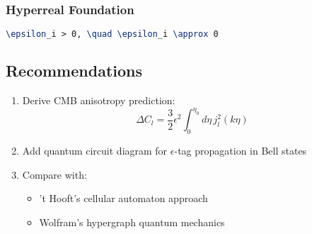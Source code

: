 \documentclass[12pt]{article}
\begin{document}
\subsubsection*{Hyperreal Foundation}
\begin{lstlisting}[language=TeX]
% Required clarification
\epsilon_i > 0, \quad \epsilon_i \approx 0
\end{lstlisting}

\subsection*{Recommendations}
\begin{enumerate}
\item Derive CMB anisotropy prediction:
\begin{equation}
\Delta C_l = \frac{3}{2}\epsilon^2 \int_0^{\eta_0} d\eta \, j_l^2(k\eta)
\end{equation}

\item Add quantum circuit diagram for $\epsilon$-tag propagation in Bell states

\item Compare with:
\begin{itemize}
\item 't Hooft's cellular automaton approach
\item Wolfram's hypergraph quantum mechanics
\end{itemize}
\end{enumerate}
\end{document}
